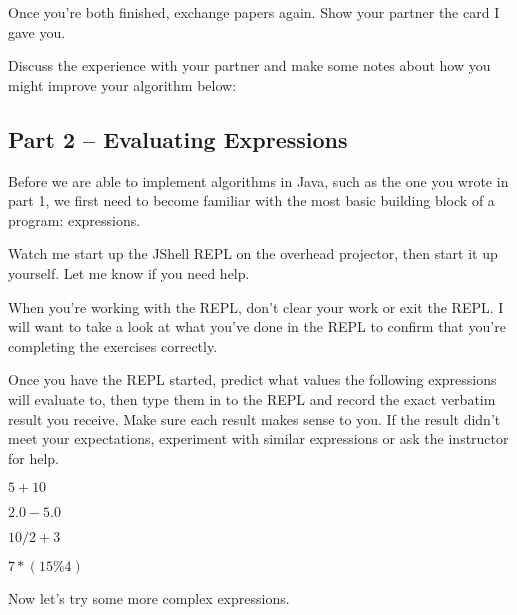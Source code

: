 Once you're both finished, exchange papers again. Show your partner the card I 
gave you. 

\begin{exer}Discuss the experience with your partner and make some notes about how
you might improve your algorithm below:

\evallinefive
\end{exer}

\initialbox

\subsection{Part 2 -- Evaluating Expressions}

Before we are able to implement algorithms in Java, such as the one you wrote
in part 1, we first need to become familiar with the most basic building block
of a program: expressions. 

Watch me start up the JShell REPL on the overhead projector, then start it up 
yourself. Let me know if you need help.

When you're working with the REPL, don't clear your work or exit the REPL. I 
will want to take a look at what you've done in the REPL to confirm that you're
completing the exercises correctly. 


\begin{eval}
Once you have the REPL started, predict what values the following expressions will evaluate to, then type them in to the REPL and record the 
exact verbatim result you receive. Make sure each result makes sense to you. If the result didn't meet your expectations, experiment with similar expressions or ask the instructor for help.
\begin{sevalenum}
\item $5 + 10$

\evalline

\item $2.0 - 5.0$

\evalline

\item $10 / 2 + 3$

\evalline

\item $7 * (15 \% 4)$

\evalline
\end{sevalenum}
\end{eval}

Now let's try some more complex expressions. 

